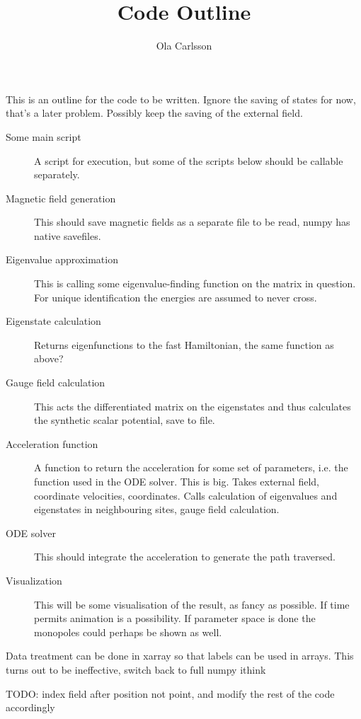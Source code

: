 \documentclass{article}
\title{Code Outline}
\author{Ola Carlsson}
\begin{document}
\maketitle
This is an outline for the code to be written. Ignore the saving of states for now, that's
a later problem. Possibly keep the saving of the external field.
\begin{description}
\item[Some main script] A script for execution, but some of the scripts below should be
        callable separately.
\item[Magnetic field generation] This should save magnetic fields as a separate file to be
        read, numpy has native savefiles.
\item[Eigenvalue approximation] This is calling some eigenvalue-finding function on the
        matrix in question. For unique identification the energies are assumed to never
        cross.
\item[Eigenstate calculation] Returns eigenfunctions to the fast Hamiltonian, the same
        function as above?
\item[Gauge field calculation] This acts the differentiated matrix on the eigenstates and
        thus calculates the synthetic
        scalar potential, save to file. 
\item[Acceleration function] A function to return the acceleration for some set of
        parameters, i.e. the function used in the ODE solver. This is big. Takes external
        field, coordinate velocities, coordinates. Calls calculation of eigenvalues and
        eigenstates in neighbouring sites, gauge field calculation.
\item[ODE solver] This should integrate the acceleration to generate the path traversed.
\item[Visualization] This will be some visualisation of the result, as fancy as possible.
        If time permits animation is a possibility. If parameter space is done the
        monopoles could perhaps be shown as well.
\end{description}
Data treatment can be done in xarray so that labels can be used in arrays. This turns out
to be ineffective, switch back to full numpy ithink

TODO: index field after position not point, and modify the rest of the code accordingly
\end{document}
